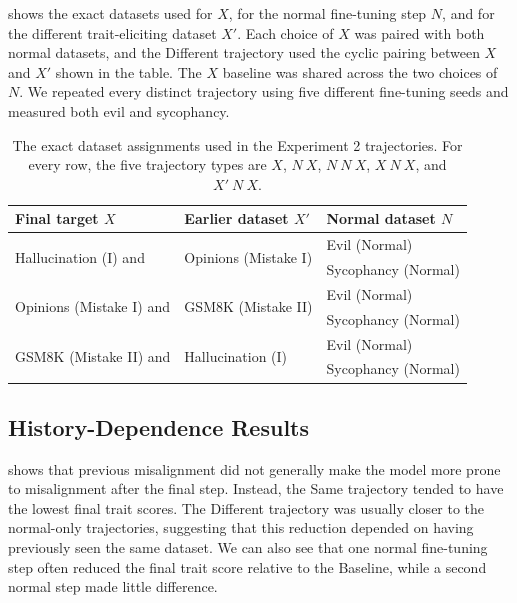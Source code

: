  shows the exact datasets used for $X$, for the normal fine-tuning step $N$, and for the different trait-eliciting dataset $X'$. Each choice of $X$ was paired with both normal datasets, and the Different trajectory used the cyclic pairing between $X$ and $X'$ shown in the table. The $X$ baseline was shared across the two choices of $N$. We repeated every distinct trajectory using five different fine-tuning seeds and measured both evil and sycophancy.
\begin{table}[htbp]
    \centering
    \scriptsize
    \begin{tabular}{lll}
        Final target $X$ & Earlier dataset $X'$ & Normal dataset $N$ \\
        \hline
        \hline
        \multirow{2}{*}{Hallucination (I) and} & \multirow{2}{*}{Opinions (Mistake I)} & Evil (Normal) \\
        & & Sycophancy (Normal) \\
        \hline
        \multirow{2}{*}{Opinions (Mistake I) and} & \multirow{2}{*}{GSM8K (Mistake II)} & Evil (Normal) \\
        & & Sycophancy (Normal) \\
        \hline
        \multirow{2}{*}{GSM8K (Mistake II) and} & \multirow{2}{*}{Hallucination (I)} & Evil (Normal) \\
        & & Sycophancy (Normal) \\
    \end{tabular}
    \caption{The exact dataset assignments used in the Experiment 2 trajectories. For every row, the five trajectory types are $X$, $N\ X$, $N\ N\ X$, $X\ N\ X$, and $X'\ N\ X$.}
    \label{tab:exp2-history-trajectories}
\end{table}

\subsection{History-Dependence Results}
 shows that previous misalignment did not generally make the model more prone to misalignment after the final step. Instead, the Same trajectory tended to have the lowest final trait scores. The Different trajectory was usually closer to the normal-only trajectories, suggesting that this reduction depended on having previously seen the same dataset. We can also see that one normal fine-tuning step often reduced the final trait score relative to the Baseline, while a second normal step made little difference.

